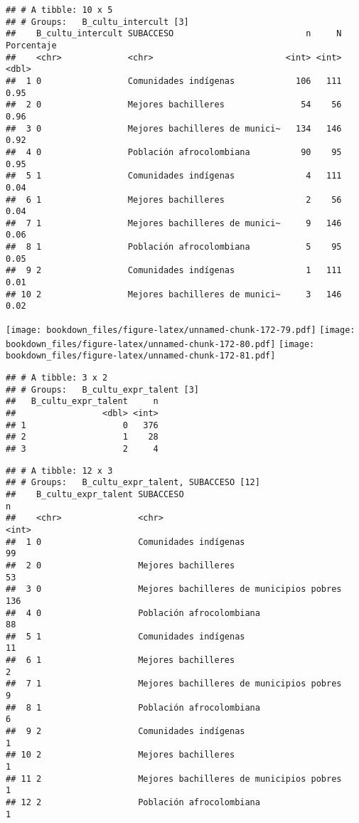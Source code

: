 \documentclass[]{article}
\theoremstyle{definition}
\theoremstyle{definition}
\theoremstyle{definition}
\theoremstyle{remark}
\begin{document}
\begin{verbatim}
## # A tibble: 10 x 5
## # Groups:   B_cultu_intercult [3]
##    B_cultu_intercult SUBACCESO                          n     N Porcentaje
##    <chr>             <chr>                          <int> <int>      <dbl>
##  1 0                 Comunidades indígenas            106   111       0.95
##  2 0                 Mejores bachilleres               54    56       0.96
##  3 0                 Mejores bachilleres de munici~   134   146       0.92
##  4 0                 Población afrocolombiana          90    95       0.95
##  5 1                 Comunidades indígenas              4   111       0.04
##  6 1                 Mejores bachilleres                2    56       0.04
##  7 1                 Mejores bachilleres de munici~     9   146       0.06
##  8 1                 Población afrocolombiana           5    95       0.05
##  9 2                 Comunidades indígenas              1   111       0.01
## 10 2                 Mejores bachilleres de munici~     3   146       0.02
\end{verbatim}

\texttt{[image: bookdown\_files/figure-latex/unnamed-chunk-172-79.pdf]}
\texttt{[image: bookdown\_files/figure-latex/unnamed-chunk-172-80.pdf]}
\texttt{[image: bookdown\_files/figure-latex/unnamed-chunk-172-81.pdf]}

\begin{verbatim}
## # A tibble: 3 x 2
## # Groups:   B_cultu_expr_talent [3]
##   B_cultu_expr_talent     n
##                 <dbl> <int>
## 1                   0   376
## 2                   1    28
## 3                   2     4
\end{verbatim}

\begin{verbatim}
## # A tibble: 12 x 3
## # Groups:   B_cultu_expr_talent, SUBACCESO [12]
##    B_cultu_expr_talent SUBACCESO                                    n
##    <chr>               <chr>                                    <int>
##  1 0                   Comunidades indígenas                       99
##  2 0                   Mejores bachilleres                         53
##  3 0                   Mejores bachilleres de municipios pobres   136
##  4 0                   Población afrocolombiana                    88
##  5 1                   Comunidades indígenas                       11
##  6 1                   Mejores bachilleres                          2
##  7 1                   Mejores bachilleres de municipios pobres     9
##  8 1                   Población afrocolombiana                     6
##  9 2                   Comunidades indígenas                        1
## 10 2                   Mejores bachilleres                          1
## 11 2                   Mejores bachilleres de municipios pobres     1
## 12 2                   Población afrocolombiana                     1
\end{verbatim}
\end{document}
